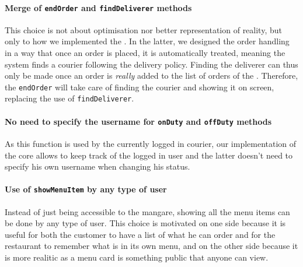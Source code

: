 \paragraph{Merge of \texttt{endOrder} and \texttt{findDeliverer} methods} %
\label{par:merge_of_endorder_and_finddeliverer}
This choice is not about optimisation nor better representation of reality,
but only to how we implemented the \Core.
In the latter, we designed the order handling in a way that once an order
is placed, it is automatically treated, meaning the system finds a courier
following the delivery policy.
Finding the deliverer can thus only be made once an order is \emph{really}
added to the list of orders of the \Core.
Therefore, the \lstinline|endOrder| will take care of finding the courier
and showing it on screen, replacing the use of \lstinline|findDeliverer|.

\paragraph{No need to specify the username for \texttt{onDuty}
and \texttt{offDuty} methods} %
\label{par:no_need_to_specify_the_username_for_lstinline_onduty_and_lstinline_offduty_methods}
As this function is used by the currently logged in courier,
our implementation of the core allows to keep track of the logged in user
and the latter doesn't need to specify his own username when changing his status.

\paragraph{Use of \texttt{showMenuItem} by any type of user} %
\label{par:use_of_lstinline_showmenuitem_by_any_type_of_user}
Instead of just being accessible to the mangare, showing all the menu
items can be done by any type of user.
This choice is motivated on one side because it is useful for both the customer
to have a list of what he can order and for the restaurant to remember what
is in its own menu, and on the other side because it is more realitic
as a menu card is something public that anyone can view.

